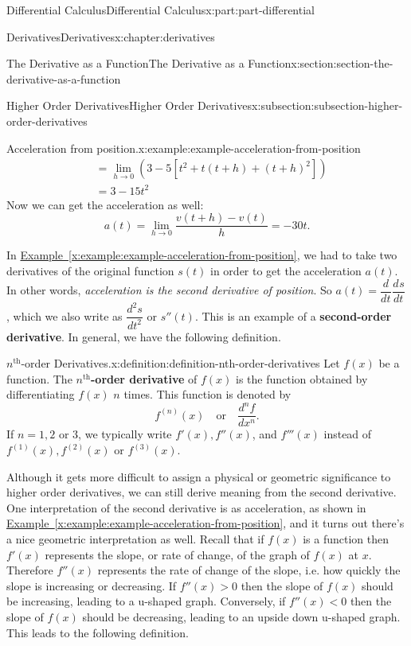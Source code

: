\documentclass[twoside,10pt,]{tufte-book}
\newcommand{\xreffont}{\relax}
\newcommand{\terminology}[1]{\textbf{#1}}
\numberwithin{equation}{part}
\newcommand{\dv}[3][]{\dfrac{d^{#1} #2}{d #3^{#1}}}
\begin{document}
\begin{partptx}{Differential Calculus}{}{Differential Calculus}{}{}{x:part:part-differential}
\begin{chapterptx}{Derivatives}{}{Derivatives}{}{}{x:chapter:derivatives}
\begin{sectionptx}{The Derivative as a Function}{}{The Derivative as a Function}{}{}{x:section:section-the-derivative-as-a-function}
\begin{subsectionptx}{Higher Order Derivatives}{}{Higher Order Derivatives}{}{}{x:subsection:subsection-higher-order-derivatives}
\begin{example}{Acceleration from position.}{x:example:example-acceleration-from-position}
\begin{align*}
& = \lim_{h\to0}(3 - 5[t^{2} + t(t+h) + (t+h)^{2}]) \\
& = 3 - 15t^{2} 
\end{align*}
Now we can get the acceleration as well:%
\begin{equation*}
a(t) = \lim_{h\to0}\frac{v(t+h) - v(t)}{h} = -30t.
\end{equation*}
%
\end{example}
In \hyperref[x:example:example-acceleration-from-position]{Example~{\xreffont\ref{x:example:example-acceleration-from-position}}}, we had to take two derivatives of the original function \(s(t)\) in order to get the acceleration \(a(t)\). In other words, \emph{acceleration is the second derivative of position}. So \(a(t) = \dv{}{t}\dv{s}{t}\), which we also write as \(\dv[2]{s}{t}\) or \(s''(t)\). This is an example of a \terminology{second-order derivative}. In general, we have the following definition.%
\begin{definition}{\(n^{\text{th}}\)-order Derivatives.}{x:definition:definition-nth-order-derivatives}%
%
Let \(f(x)\) be a function. The \terminology{\(n^{\text{th}}\)-order derivative} of \(f(x)\) is the function obtained by differentiating \(f(x)\) \(n\) times. This function is denoted by%
\begin{equation*}
f^{(n)}(x)\quad\text{or}\quad\dv[n]{f}{x}.
\end{equation*}
If \(n=1, 2\) or \(3\), we typically write \(f'(x), f''(x)\), and \(f'''(x)\) instead of \(f^{(1)}(x), f^{(2)}(x)\) or \(f^{(3)}(x)\).%
\end{definition}
Although it gets more difficult to assign a physical or geometric significance to higher order derivatives, we can still derive meaning from the second derivative. One interpretation of the second derivative is as acceleration, as shown in \hyperref[x:example:example-acceleration-from-position]{Example~{\xreffont\ref{x:example:example-acceleration-from-position}}}, and it turns out there's a nice geometric interpretation as well. Recall that if \(f(x)\) is a function then \(f'(x)\) represents the slope, or rate of change, of the graph of \(f(x)\) at \(x\). Therefore \(f''(x)\) represents the rate of change of the slope, i.e. how quickly the slope is increasing or decreasing. If \(f''(x) >0\) then the slope of \(f(x)\) should be increasing, leading to a u-shaped graph. Conversely, if \(f''(x) <0\) then the slope of \(f(x)\) should be decreasing, leading to an upside down u-shaped graph. This leads to the following definition.%

\end{subsectionptx}
\end{sectionptx}
\end{chapterptx}
\end{partptx}
\end{document}
